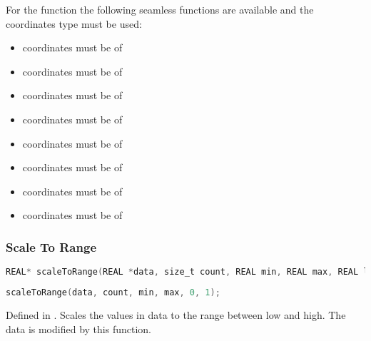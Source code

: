 For the  function the following seamless functions are available and the
coordinates type must be used:

\begin{itemize}
\item {} coordinates must be of 
\item {} coordinates must be of 
\item {} coordinates must be of 
\item {} coordinates must be of 
\item {} coordinates must be of 
\item {} coordinates must be of 
\item {} coordinates must be of 
\item {} coordinates must be of 
\end{itemize}

\subsubsection{Scale To Range}

\begin{lstlisting}[caption={Definition of scaleToRange function},label={lst:scale_to_range_definition},language=OpenCL]
REAL* scaleToRange(REAL *data, size_t count, REAL min, REAL max, REAL low, REAL high);
\end{lstlisting}

\begin{lstlisting}[caption={Example for scaleToRange function. The data will be scaled to fit between 0 and 1.},label={lst:scale_to_range_example},language=OpenCL]
scaleToRange(data, count, min, max, 0, 1);
\end{lstlisting}

Defined in .
Scales the values in data to the range between low and high.
The data is modified by this function.
 
